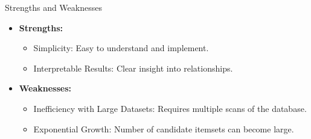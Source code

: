 \documentclass[aspectratio=169]{beamer}
\begin{document}
\begin{frame}[fragile]
    \begin{block}{Strengths and Weaknesses}
        \begin{itemize}
            \item \textbf{Strengths:}
            \begin{itemize}
                \item Simplicity: Easy to understand and implement.
                \item Interpretable Results: Clear insight into relationships.
            \end{itemize}
            \item \textbf{Weaknesses:}
            \begin{itemize}
                \item Inefficiency with Large Datasets: Requires multiple scans of the database.
                \item Exponential Growth: Number of candidate itemsets can become large.
            \end{itemize}
        \end{itemize}
    \end{block}
\end{frame}
\end{document}
